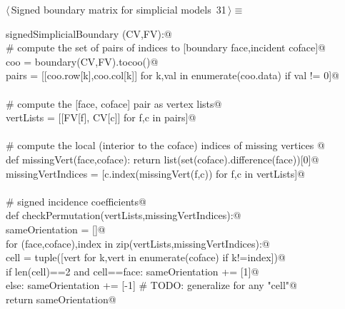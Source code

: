 \documentclass[11pt,oneside]{article}    %
\begin{document}
\begin{flushleft} \small \label{scrap51}
\protect{}$\langle\,$Signed boundary matrix for simplicial models\nobreak\ {\footnotesize 31}$\,\rangle\equiv$
\vspace{-1ex}
\begin{list}{}{} \item
\mbox{}\verb@def signedSimplicialBoundary (CV,FV):@\\
\mbox{}\verb@    # compute the set of pairs of indices to [boundary face,incident coface]@\\
\mbox{}\verb@    coo = boundary(CV,FV).tocoo()@\\
\mbox{}\verb@    pairs = [[coo.row[k],coo.col[k]] for k,val in enumerate(coo.data) if val != 0]@\\
\mbox{}\verb@@\\
\mbox{}\verb@    # compute the [face, coface] pair as vertex lists@\\
\mbox{}\verb@    vertLists = [[FV[f], CV[c]] for f,c in pairs]@\\
\mbox{}\verb@@\\
\mbox{}\verb@    # compute the local (interior to the coface) indices of missing vertices @\\
\mbox{}\verb@    def missingVert(face,coface): return list(set(coface).difference(face))[0]@\\
\mbox{}\verb@    missingVertIndices = [c.index(missingVert(f,c)) for f,c in vertLists]@\\
\mbox{}\verb@@\\
\mbox{}\verb@    # signed incidence coefficients@\\
\mbox{}\verb@    def checkPermutation(vertLists,missingVertIndices):@\\
\mbox{}\verb@        sameOrientation = []@\\
\mbox{}\verb@        for (face,coface),index in zip(vertLists,missingVertIndices):@\\
\mbox{}\verb@            cell = tuple([vert for k,vert in enumerate(coface) if k!=index])@\\
\mbox{}\verb@            if len(cell)==2 and cell==face: sameOrientation += [1]@\\
\mbox{}\verb@            else: sameOrientation += [-1]  # TODO: generalize for any "cell"@\\
\mbox{}\verb@        return sameOrientation@\\

\end{list}
\end{flushleft}
\end{document}
